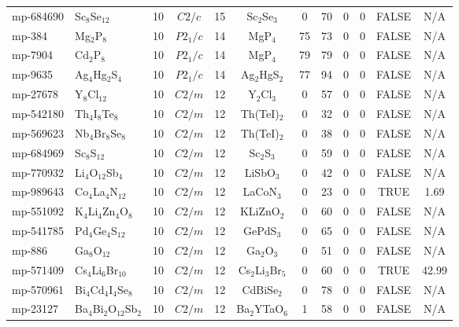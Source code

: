 {\begin{longtable}{llcccccccccc}
    mp-684690 & Sc$_{8}$Se$_{12}$ & 10    & $C2/c$ & 15    & Sc$_{2}$Se$_{3}$ & 0     & 70    & 0     & 0     & FALSE & N/A \\
    mp-384 & Mg$_{2}$P$_{8}$ & 10    & $P2_1/c$ & 14    & MgP$_{4}$ & 75    & 73    & 0     & 0     & FALSE & N/A \\
    mp-7904 & Cd$_{2}$P$_{8}$ & 10    & $P2_1/c$ & 14    & MgP$_{4}$ & 79    & 79    & 0     & 0     & FALSE & N/A \\
    mp-9635 & Ag$_{4}$Hg$_{2}$S$_{4}$ & 10    & $P2_1/c$ & 14    & Ag$_{2}$HgS$_{2}$ & 77    & 94    & 0     & 0     & FALSE & N/A \\
    mp-27678 & Y$_{8}$Cl$_{12}$ & 10    & $C2/m$ & 12    & Y$_{2}$Cl$_{3}$ & 0     & 57    & 0     & 0     & FALSE & N/A \\
    mp-542180 & Th$_{4}$I$_{8}$Te$_{8}$ & 10    & $C2/m$ & 12    & Th(TeI)$_{2}$ & 0     & 32    & 0     & 0     & FALSE & N/A \\
    mp-569623 & Nb$_{4}$Br$_{8}$Se$_{8}$ & 10    & $C2/m$ & 12    & Th(TeI)$_{2}$ & 0     & 38    & 0     & 0     & FALSE & N/A \\
    mp-684969 & Sc$_{8}$S$_{12}$ & 10    & $C2/m$ & 12    & Sc$_{2}$S$_{3}$ & 0     & 59    & 0     & 0     & FALSE & N/A \\
    mp-770932 & Li$_{4}$O$_{12}$Sb$_{4}$ & 10    & $C2/m$ & 12    & LiSbO$_{3}$ & 0     & 42    & 0     & 0     & FALSE & N/A \\
    mp-989643 & Co$_{4}$La$_{4}$N$_{12}$ & 10    & $C2/m$ & 12    & LaCoN$_{3}$ & 0     & 23    & 0     & 0     & TRUE  & 1.69  \\
    mp-551092 & K$_{4}$Li$_{4}$Zn$_{4}$O$_{8}$ & 10    & $C2/m$ & 12    & KLiZnO$_{2}$ & 0     & 60    & 0     & 0     & FALSE & N/A \\
    mp-541785 & Pd$_{4}$Ge$_{4}$S$_{12}$ & 10    & $C2/m$ & 12    & GePdS$_{3}$ & 0     & 65    & 0     & 0     & FALSE & N/A \\
    mp-886 & Ga$_{8}$O$_{12}$ & 10    & $C2/m$ & 12    & Ga$_{2}$O$_{3}$ & 0     & 51    & 0     & 0     & FALSE & N/A \\
    mp-571409 & Cs$_{4}$Li$_{6}$Br$_{10}$ & 10    & $C2/m$ & 12    & Cs$_{2}$Li$_{3}$Br$_{5}$ & 0     & 60    & 0     & 0     & TRUE  & 42.99  \\
    mp-570961 & Bi$_{4}$Cd$_{4}$I$_{4}$Se$_{8}$ & 10    & $C2/m$ & 12    & CdBiSe$_{2}$ & 0     & 78    & 0     & 0     & FALSE & N/A \\
    mp-23127 & Ba$_{4}$Bi$_{2}$O$_{12}$Sb$_{2}$ & 10    & $C2/m$ & 12    & Ba$_{2}$YTaO$_{6}$ & 1     & 58    & 0     & 0     & FALSE & N/A \\

\end{longtable}}
